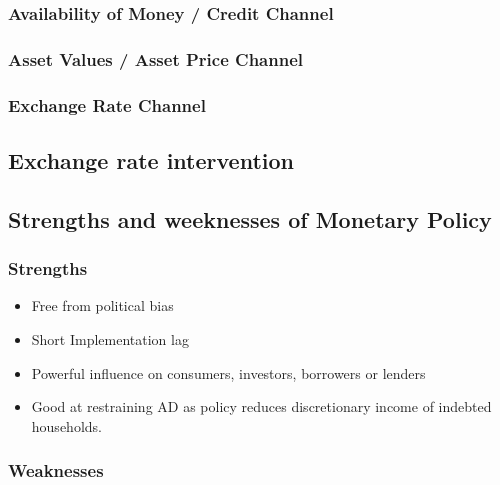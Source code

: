 \documentclass[11pt]{article}
\begin{document}
\subsubsection{Availability of Money / Credit Channel}
\label{sec-3-8-3}

\subsubsection{Asset Values / Asset Price Channel}
\label{sec-3-8-4}

\subsubsection{Exchange Rate Channel}
\label{sec-3-8-5}

\subsection{Exchange rate intervention}
\label{sec-3-9}



\subsection{Strengths and weeknesses of Monetary Policy}
\label{sec-3-10}

\subsubsection{Strengths}
\label{sec-3-10-1}

\begin{itemize}
\item Free from political bias
\item Short Implementation lag
\item Powerful influence on consumers, investors, borrowers or lenders
\item Good at restraining AD as policy reduces discretionary income of
indebted households.
\end{itemize}

\subsubsection{Weaknesses}
\label{sec-3-10-2}
\end{document}
